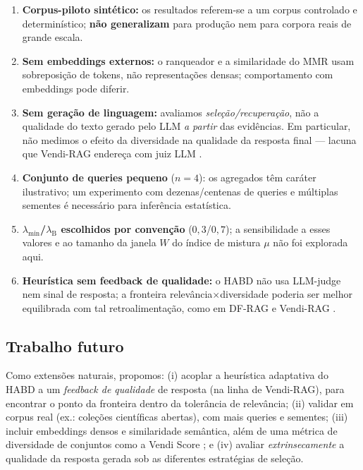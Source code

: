 \begin{enumerate}
  \item \textbf{Corpus-piloto sintético:} os resultados referem-se a um corpus
        controlado e determinístico; \textbf{não generalizam} para produção nem
        para corpora reais de grande escala.
  \item \textbf{Sem embeddings externos:} o ranqueador e a similaridade do MMR
        usam sobreposição de tokens, não representações densas; comportamento com
        embeddings pode diferir.
  \item \textbf{Sem geração de linguagem:} avaliamos \emph{seleção/recuperação},
        não a qualidade do texto gerado pelo LLM \emph{a partir} das evidências.
        Em particular, não medimos o efeito da diversidade na qualidade da
        resposta final — lacuna que Vendi-RAG endereça com juiz LLM
        \citep{RezaeiDieng2025VendiRAG}.
  \item \textbf{Conjunto de queries pequeno} ($n=4$): os agregados têm caráter
        ilustrativo; um experimento com dezenas/centenas de queries e múltiplas
        sementes é necessário para inferência estatística.
  \item \textbf{$\lambda_{\min}$/$\lambda_{\mathrm B}$ escolhidos por
        convenção} ($0{,}3$/$0{,}7$); a sensibilidade a esses valores e ao tamanho
        da janela $W$ do índice de mistura $\mu$ não foi explorada aqui.
  \item \textbf{Heurística sem feedback de qualidade:} o HABD não usa LLM-judge
        nem sinal de resposta; a fronteira relevância$\times$diversidade poderia
        ser melhor equilibrada com tal retroalimentação, como em DF-RAG e
        Vendi-RAG \citep{Khan2026DFRAG,RezaeiDieng2025VendiRAG}.
\end{enumerate}

\subsection{Trabalho futuro}

Como extensões naturais, propomos: (i) acoplar a heurística adaptativa do HABD a
um \emph{feedback de qualidade} de resposta (na linha de Vendi-RAG), para
encontrar o ponto da fronteira dentro da tolerância de relevância; (ii) validar em
corpus real (ex.: coleções científicas abertas), com mais queries e sementes; (iii)
incluir embeddings densos e similaridade semântica, além de uma métrica de
diversidade de conjuntos como a Vendi Score \citep{RezaeiDieng2025VendiRAG}; e (iv)
avaliar \emph{extrinsecamente} a qualidade da resposta gerada sob as diferentes
estratégias de seleção.
